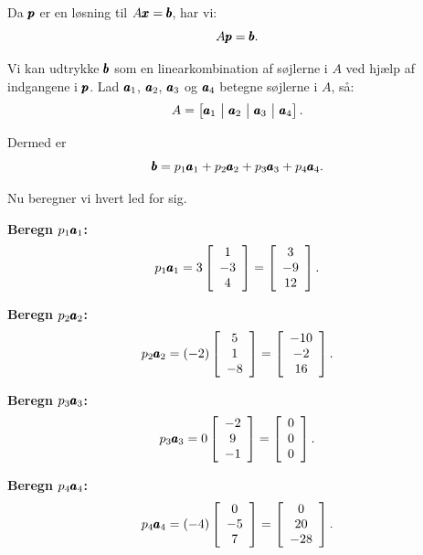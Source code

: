 \begin{solution} Da $\pmb{p}$ er en løsning til $A \pmb{x} = \pmb{b}$, har vi:
    \[
    A \pmb{p} = \pmb{b}.
    \]
    
    Vi kan udtrykke $\pmb{b}$ som en linearkombination af søjlerne i $A$ ved hjælp af indgangene i $\pmb{p}$. Lad $\pmb{a}_1$, $\pmb{a}_2$, $\pmb{a}_3$ og $\pmb{a}_4$ betegne søjlerne i $A$, så:
    \[
    A = \left[ \vect{a}_1 \ \big| \ \vect{a}_2 \ \big| \ \vect{a}_3 \ \big| \ \vect{a}_4 \right].
    \]
    
    Dermed er
    \[
    \pmb{b} = p_1 \pmb{a}_1 + p_2 \pmb{a}_2 + p_3 \pmb{a}_3 + p_4 \pmb{a}_4.
    \]
    
    Nu beregner vi hvert led for sig.
    
    \textbf{Beregn $p_1 \pmb{a}_1$:}
    \[
    p_1 \pmb{a}_1 = 3 \left[\begin{array}{c}
    1 \\
    -3 \\
    4
    \end{array}\right] = \left[\begin{array}{c}
    3 \\
    -9 \\
    12
    \end{array}\right].
    \]
    
    \textbf{Beregn $p_2 \pmb{a}_2$:}
    \[
    p_2 \pmb{a}_2 = (-2) \left[\begin{array}{c}
    5 \\
    1 \\
    -8
    \end{array}\right] = \left[\begin{array}{c}
    -10 \\
    -2 \\
    16
    \end{array}\right].
    \]
    
    \textbf{Beregn $p_3 \pmb{a}_3$:}
    \[
    p_3 \pmb{a}_3 = 0 \left[\begin{array}{c}
    -2 \\
    9 \\
    -1
    \end{array}\right] = \left[\begin{array}{c}
    0 \\
    0 \\
    0
    \end{array}\right].
    \]
    
    \textbf{Beregn $p_4 \pmb{a}_4$:}
    \[
    p_4 \pmb{a}_4 = (-4) \left[\begin{array}{c}
    0 \\
    -5 \\
    7
    \end{array}\right] = \left[\begin{array}{c}
    0 \\
    20 \\
    -28
    \end{array}\right].
    \]
    

\end{solution}
